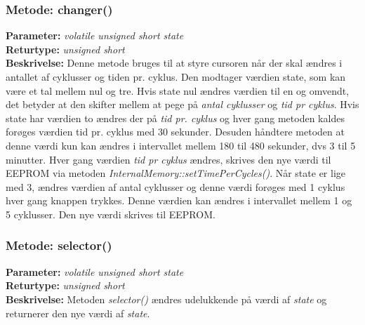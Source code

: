 \subsubsection{Metode: changer()}
\textbf{Parameter: } \textit{volatile unsigned short state}
\\ \textbf{Returtype: } \textit{unsigned short}
\\ \textbf{Beskrivelse: } Denne metode bruges til at styre cursoren når der skal ændres i antallet af cyklusser og tiden pr. cyklus. Den modtager værdien state, som kan være et tal mellem nul og tre. Hvis state nul ændres værdien til en og omvendt, det betyder at den skifter mellem at pege på \textit{antal cyklusser} og \textit{tid pr cyklus}. 
Hvis state har værdien to ændres der på \textit{tid pr. cyklus }og hver gang metoden kaldes forøges værdien tid pr. cyklus med 30 sekunder. Desuden håndtere metoden at denne værdi kun kan ændres i intervallet mellem 180 til 480 sekunder, dvs 3 til 5 minutter. Hver gang værdien \textit{tid pr cyklus} ændres, skrives den nye værdi til EEPROM via metoden \textit{InternalMemory::setTimePerCycles()}. 
Når state er lige med 3, ændres værdien af antal cyklusser og denne værdi forøges med 1 cyklus hver gang knappen trykkes. Denne værdien kan ændres i intervallet mellem 1 og 5 cyklusser. Den nye værdi skrives til EEPROM. 

\subsubsection{Metode: selector()}
\textbf{Parameter: } \textit{volatile unsigned short state}
\\ \textbf{Returtype: } \textit{unsigned short}
\\ \textbf{Beskrivelse: } Metoden \textit{selector()} ændres udelukkende på værdi af \textit{state} og returnerer den nye værdi af \textit{state}. 
